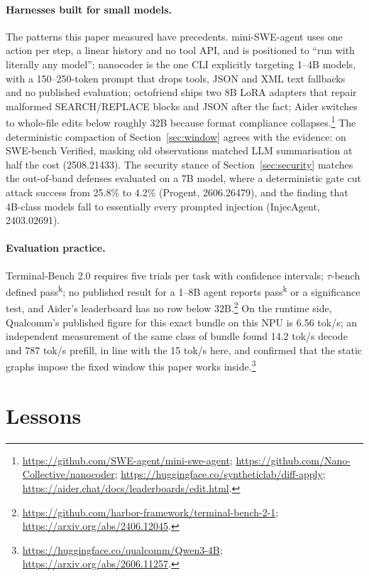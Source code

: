 \documentclass[11pt]{article}
\begin{document}
\paragraph{Harnesses built for small models.} The patterns this paper
measured have precedents. mini-SWE-agent uses one action per step, a linear
history and no tool API, and is positioned to ``run with literally any
model''; nanocoder is the one CLI explicitly targeting 1--4B models, with a
150--250-token prompt that drops tools, JSON and XML text fallbacks and no
published evaluation; octofriend ships two 8B LoRA adapters that repair
malformed SEARCH/REPLACE blocks and JSON after the fact; Aider switches to
whole-file edits below roughly 32B because format compliance
collapses.\footnote{\url{https://github.com/SWE-agent/mini-swe-agent};
\url{https://github.com/Nano-Collective/nanocoder};
\url{https://huggingface.co/syntheticlab/diff-apply};
\url{https://aider.chat/docs/leaderboards/edit.html}.} The deterministic compaction of
Section~\ref{sec:window} agrees with the evidence: on SWE-bench Verified,
masking old observations matched LLM summarisation at half the cost
(2508.21433). The security stance of Section~\ref{sec:security} matches the out-of-band
defenses evaluated on a 7B model, where a deterministic gate cut attack
success from 25.8\% to 4.2\% (Progent, 2606.26479), and the finding that
4B-class models fall to essentially every prompted injection (InjecAgent,
2403.02691).

\paragraph{Evaluation practice.} Terminal-Bench 2.0 requires five trials per
task with confidence intervals; $\tau$-bench defined
pass\textsuperscript{k}; no published result for a 1--8B agent reports
pass\textsuperscript{k} or a significance test, and Aider's leaderboard has
no row below 32B.\footnote{\url{https://github.com/harbor-framework/terminal-bench-2-1};
\url{https://arxiv.org/abs/2406.12045}.} On the runtime side, Qualcomm's
published figure for this exact bundle on this NPU is 6.56 tok/s; an
independent measurement of the same class of bundle found 14.2 tok/s decode
and 787 tok/s prefill, in line with the 15 tok/s here, and confirmed that
the static graphs impose the fixed window this paper works
inside.\footnote{\url{https://huggingface.co/qualcomm/Qwen3-4B};
\url{https://arxiv.org/abs/2606.11257}.}

\section{Lessons}
\end{document}

